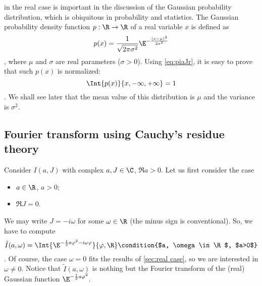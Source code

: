   in the real case is
important in the discussion of the Gaussian probability distribution, which is
obiquitous in probability and statistics. The Gaussian probability density
function $p:\R\rightarrow\R$ of a real variable $x$ is  defined as
\begin{dmath*}
   p(x) = \frac{1}{\sqrt{2\pi\sigma^{2}}} \E^{ - \frac{\left( x -
	    \mu\right)^{2}}{2\sigma^{2}} }
\end{dmath*},
where $\mu$ and $\sigma$ are real parameters ($\sigma>0$).
Using \cref{eq:piaJr}, it is easy to prove that such $p(x)$ is normalized:
\begin{dmath*}
   \Int{p(x)}{x, -\infty, +\infty} = 1 
\end{dmath*}.
We shall see later that the mean value of this distribution is $\mu$ and the
variance is $\sigma^{2}$.

\subsection{Fourier transform using Cauchy's residue theory}
\label{sec:Fourier case}


Consider $I(a,J)$ with complex $a,J\in\C$, $\Re a >0$. 
Let us first consider the case
\begin{itemize}
   \item $a\in\R$, $a>0$;
   \item $\Re J = 0$.
\end{itemize}
We may write $J = -i \omega$ for some $\omega \in\R$ (the minus
sign is conventional).
So, we have to compute
\begin{dmath}[label={piaJi}]
   \tilde{I}( a, \omega) = \Int{ \E^{-\frac{1}{2}a \varphi^{2} - i \omega \varphi}}{ \varphi, \R} 
   \condition{$a, \omega \in \R$, $a>0$}
\end{dmath}.
Of course, the case $\omega=0$ fits the results of \cref{sec:real case},
so we are interested in $\omega\neq 0$.
Notice that
$\tilde{I}(a, \omega)$ is nothing but the Fourier transform of the (real) Gaussian function
$\E^{-\frac{1}{2}a\varphi^{2}}$.

